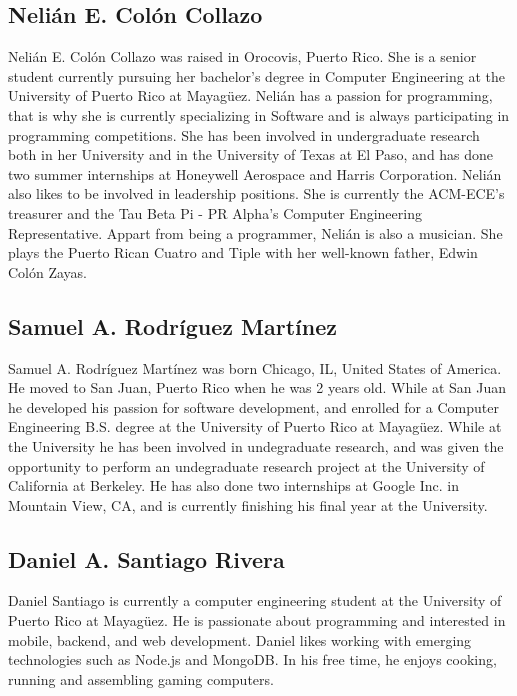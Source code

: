 \label{sec:bios}

\subsection{Nelián E. Colón Collazo}

Nelián E. Colón Collazo was raised in Orocovis, Puerto Rico. She is a senior
student currently pursuing her bachelor's degree in Computer Engineering at the
University of Puerto Rico at Mayagüez. Nelián has a passion for programming,
that is why she is currently specializing in Software and is always
participating in programming competitions. She has been involved in
undergraduate research both in her University and in the University of Texas at
El Paso, and has done two summer internships at Honeywell Aerospace and Harris
Corporation. Nelián also likes to be involved in leadership positions. She is
currently the ACM-ECE's treasurer and the Tau Beta Pi - PR Alpha's Computer
Engineering Representative. Appart from being a programmer, Nelián is also a
musician. She plays the Puerto Rican Cuatro and Tiple with her well-known
father, Edwin Colón Zayas.

\subsection{Samuel A. Rodríguez Martínez}

Samuel A. Rodríguez Martínez was born Chicago, IL, United States of America. He
moved to San Juan, Puerto Rico when he was 2 years old. While at San Juan he
developed his passion for software development, and enrolled for a Computer
Engineering B.S. degree at the University of Puerto Rico at Mayagüez. While at
the University he has been involved in undegraduate research, and was given the
opportunity to perform an undegraduate research project at the University of
California at Berkeley. He has also done two internships at Google Inc. in
Mountain View, CA, and is currently finishing his final year at the University.

\subsection{Daniel A. Santiago Rivera}

Daniel Santiago is currently a computer engineering student at the University of
Puerto Rico at Mayagüez. He is passionate about programming and interested in
mobile, backend, and web development. Daniel likes working with emerging
technologies such as Node.js and MongoDB. In his free time, he enjoys cooking,
running and assembling gaming computers.
